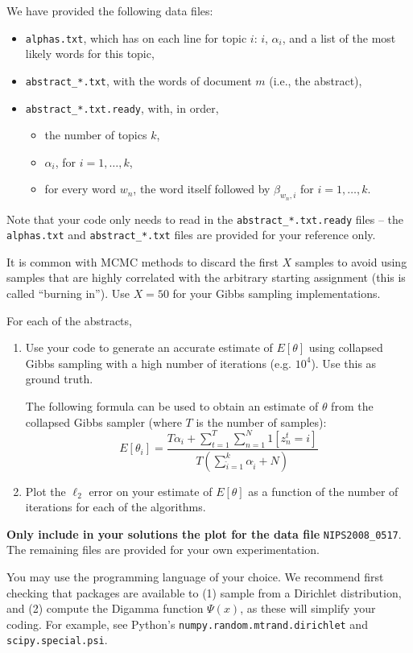 \documentclass{article}
\begin{document}
\begin{enumerate}
\begin{enumerate}
We have provided the following data files:
\begin{itemize}
      \item \texttt{alphas.txt}, which has on each line for topic $i$: $i$, $\alpha_i$, and a list of the most likely words for this topic,
      \item \texttt{abstract\_*.txt}, with the words of document $m$ (i.e., the abstract),
      \item \texttt{abstract\_*.txt.ready}, with, in order,
      \begin{itemize}
           \item the number of topics $k$,
           \item $\alpha_i$, for $i = 1, \ldots, k$,
           \item for every word $w_n$, the word itself followed by $\beta_{w_n,i}$ 
           for $i = 1, \ldots, k$.
      \end{itemize}
\end{itemize}
Note that your code only needs to read in the \texttt{abstract\_*.txt.ready} files -- the \texttt{alphas.txt} and \texttt{abstract\_*.txt} files are provided for your reference only.

It is common with MCMC methods to discard the first $X$ samples to avoid using samples that are highly correlated with the arbitrary starting assignment (this is called ``burning in''). Use $X=50$ for your Gibbs sampling implementations.

For each of the abstracts,
\begin{enumerate}
\item Use your code to generate an accurate estimate of $E[\theta]$ using collapsed Gibbs sampling with a high number of iterations (e.g. $10^4$). Use this as ground truth. %

The following formula can be used to obtain an estimate of $\theta$ from the collapsed Gibbs sampler (where $T$ is the number of samples):
\[
E[\theta_i] = \frac{T\alpha_i + \sum_{t=1}^T\sum_{n=1}^N 1[z^t_{n} = i]}{T(\sum_{\hat{i}=1}^k \alpha_{\hat{i}} + N)}
\]

\item Plot the $\ell_2$ error on your estimate of $E[\theta]$ as a function of the number of iterations for each of the algorithms.

\end{enumerate}

{\bf Only include in your solutions the plot for the data file} \texttt{NIPS2008\_0517}. The remaining files are provided for your own experimentation.

You may use the programming language of your choice. We recommend first checking that packages are available to (1) sample from a Dirichlet distribution, and (2) compute the Digamma function $\Psi(x)$, as these will simplify your coding. For example, see Python's \texttt{numpy.random.mtrand.dirichlet} and \texttt{scipy.special.psi}.

\end{enumerate}
\end{enumerate}




\end{document}
